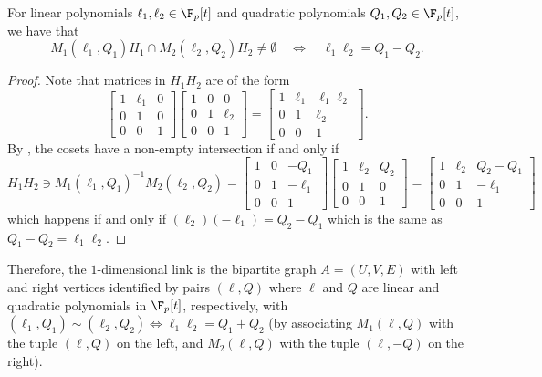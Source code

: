 \documentclass{toc}
\begin{document}
\begin{lemma}
  For linear polynomials $\ell_1,\ell_2 \in \F_p[t]$ and quadratic polynomials $Q_1,Q_2 \in \F_p[t]$, we have that
  \[
    M_1(\ell_1,Q_1) H_1 \cap M_2(\ell_2,Q_2) H_2 \neq \emptyset \quad\Longleftrightarrow\quad \ell_1\ell_2 = Q_1 - Q_2.
  \]
\end{lemma}
\begin{proof}
  Note that matrices in $H_1H_2$ are of the form
  \[
    \begin{bmatrix}
      1 & \ell_1 & 0\\
      0  & 1 & 0\\
      0  & 0 & 1
    \end{bmatrix}
    \begin{bmatrix}
      1 & 0 & 0\\
      0  & 1 & \ell_2\\
      0  & 0 & 1
    \end{bmatrix} = \begin{bmatrix}
      1 & \ell_1 & \ell_1\ell_2\\
      0  & 1 & \ell_2\\
      0  & 0 & 1
    \end{bmatrix}.
  \]
  By , the cosets have a non-empty intersection if and only if
  \[
    H_1 H_2 \ni M_1(\ell_1,Q_1)^{-1} M_2(\ell_2,Q_2) = \begin{bmatrix}
      1 & 0 & -Q_1\\
      0 & 1 & -\ell_1\\
      0 & 0 & 1
    \end{bmatrix}\begin{bmatrix}
      1 & \ell_2 & Q_2\\
      0 & 1 & 0\\
      0 & 0 & 1
    \end{bmatrix} = \begin{bmatrix}
      1 & \ell_2 & Q_2 - Q_1\\0 & 1 & -\ell_1 \\ 0 & 0 & 1
    \end{bmatrix}
  \]
  which happens if and only if $(\ell_2)(-\ell_1) = Q_2 - Q_1$ which is the same as $Q_1 - Q_2 = \ell_1\ell_2$. 
\end{proof}

Therefore, the $1$-dimensional link is the bipartite graph $A=(U,V,E)$
with left and right vertices identified by pairs $(\ell,Q)$ where
$\ell$ and $Q$ are linear and quadratic polynomials 
in $\F_p[t]$,  %
respectively, with
$(\ell_1,Q_1) \sim (\ell_2,Q_2) \Leftrightarrow \ell_1\ell_2 = Q_1 +
Q_2$ (by associating $M_1(\ell,Q)$ with the tuple $(\ell,Q)$ on the
left, and $M_2(\ell,Q)$ with the tuple $(\ell,-Q)$ on the right).
\end{document}
